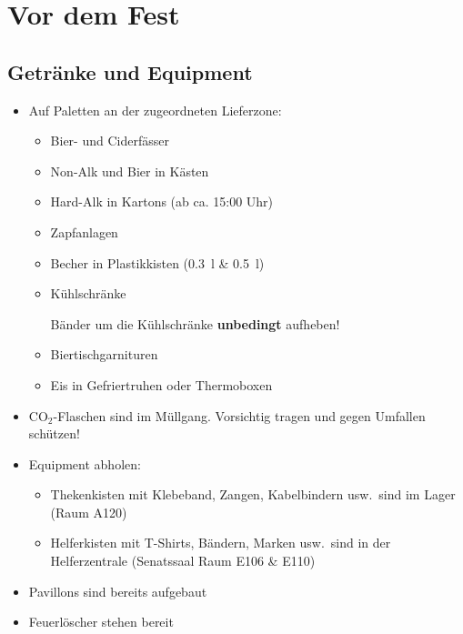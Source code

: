 \section{Vor dem Fest}
\subsection{Getränke und Equipment}
\begin{itemize}
  \item Auf Paletten an der zugeordneten Lieferzone:
    \begin{itemize}
      \item Bier- und Ciderfässer
      \item Non-Alk und Bier in Kästen
      \item Hard-Alk in Kartons (ab ca. 15:00 Uhr)
      \item Zapfanlagen
      \item Becher in Plastikkisten (\SI{0.3}{\litre} \& \SI{0.5}{\litre})
      \item Kühlschränke

        Bänder um die Kühlschränke \textbf{unbedingt} aufheben!
      \item Biertischgarnituren
      \item Eis in Gefriertruhen oder Thermoboxen
    \end{itemize}
  \item CO$_2$-Flaschen sind im Müllgang. Vorsichtig tragen und gegen Umfallen schützen!
  \item Equipment abholen:
    \begin{itemize}
      \item Thekenkisten mit Klebeband, Zangen, Kabelbindern usw.\ sind im Lager (Raum A120) %
      \item Helferkisten mit T-Shirts, Bändern, Marken usw.\ sind in der Helferzentrale (Senatssaal Raum E106 \& E110)
    \end{itemize}
  \item Pavillons sind bereits aufgebaut
  \item Feuerlöscher stehen bereit
\end{itemize}
